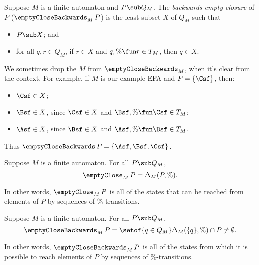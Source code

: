 Suppose $M$ is a finite automaton and $P\sub Q_M$.  The \emph{backwards
empty-closure} of $P$ ($\emptyCloseBackwards_M\,P$) is the least
subset $X$ of $Q_M$ such that
\begin{itemize}
\item $P\sub X$; and

\item for all $q,r\in Q_M$, if $r\in X$ and $q,\%\fun r\in T_M$, then
$q\in X$.
\end{itemize}
We sometimes drop the $M$ from $\emptyCloseBackwards_M$, when
it's clear from the context.
For example, if $M$ is our example EFA and $P=\{\Csf\}$, then:
\begin{itemize}
\item $\Csf\in X$;

\item $\Bsf\in X$, since $\Csf\in X$ and $\Bsf,\%\fun\Csf\in T_M$;

\item $\Asf\in X$, since $\Bsf\in X$ and $\Asf,\%\fun\Bsf\in T_M$.
\end{itemize}
Thus $\emptyCloseBackwards\,P=\{\Asf,\Bsf,\Csf\}$.
  
\begin{proposition}
Suppose $M$ is a finite automaton.  For all $P\sub Q_M$,
\begin{displaymath}
\emptyClose_M\,P=\Delta_M(P,\%) .  
\end{displaymath}
\end{proposition}

In other words, $\emptyClose_M\,P$ is all of the states that can be
reached from elements of $P$ by sequences of $\%$-transitions.

\begin{proposition}
Suppose $M$ is a finite automaton.  For all $P\sub Q_M$,
\begin{displaymath}
\emptyCloseBackwards_M\,P=
\setof{q\in Q_M}{\Delta_M(\{q\},\%)\cap P\neq\emptyset} .
\end{displaymath}
\end{proposition}

In other words, $\emptyCloseBackwards_M\,P$ is all of the states from
which it is possible to reach elements of $P$ by sequences of
$\%$-transitions.

